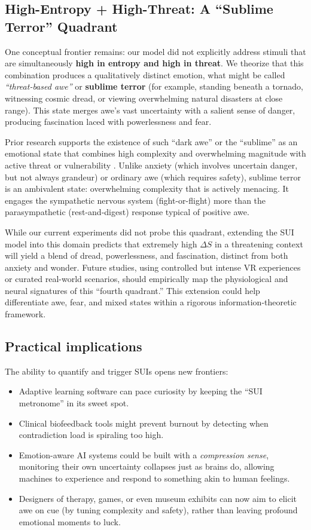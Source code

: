 \documentclass[12pt,a4paper]{article}
\begin{document}
\subsection*{High-Entropy + High-Threat: A ``Sublime Terror'' Quadrant}
One conceptual frontier remains: our model did not explicitly address stimuli that are simultaneously \textbf{high in entropy and high in threat}. We theorize that this combination produces a qualitatively distinct emotion, what might be called \emph{“threat-based awe”} or \textbf{sublime terror} (for example, standing beneath a tornado, witnessing cosmic dread, or viewing overwhelming natural disasters at close range). This state merges awe’s vast uncertainty with a salient sense of danger, producing fascination laced with powerlessness and fear.

Prior research supports the existence of such “dark awe” or the “sublime” as an emotional state that combines high complexity and overwhelming magnitude with active threat or vulnerability \cite{Gordon2017}. Unlike anxiety (which involves uncertain danger, but not always grandeur) or ordinary awe (which requires safety), sublime terror is an ambivalent state: overwhelming complexity that is actively menacing. It engages the sympathetic nervous system (fight-or-flight) more than the parasympathetic (rest-and-digest) response typical of positive awe. 

While our current experiments did not probe this quadrant, extending the SUI model into this domain predicts that extremely high $\Delta S$ in a threatening context will yield a blend of dread, powerlessness, and fascination, distinct from both anxiety and wonder. Future studies, using controlled but intense VR experiences or curated real-world scenarios, should empirically map the physiological and neural signatures of this “fourth quadrant.” This extension could help differentiate awe, fear, and mixed states within a rigorous information-theoretic framework.

\subsection*{Practical implications}
The ability to quantify and trigger SUIs opens new frontiers:
\begin{itemize}[leftmargin=*]
    \item Adaptive learning software can pace curiosity by keeping the “SUI metronome” in its sweet spot.
    \item Clinical biofeedback tools might prevent burnout by detecting when contradiction load is spiraling too high.
    \item Emotion-aware AI systems could be built with a \emph{compression sense}, monitoring their own uncertainty collapses just as brains do, allowing machines to experience and respond to something akin to human feelings.
    \item Designers of therapy, games, or even museum exhibits can now aim to elicit awe on cue (by tuning complexity and safety), rather than leaving profound emotional moments to luck.
\end{itemize}
\end{document}
